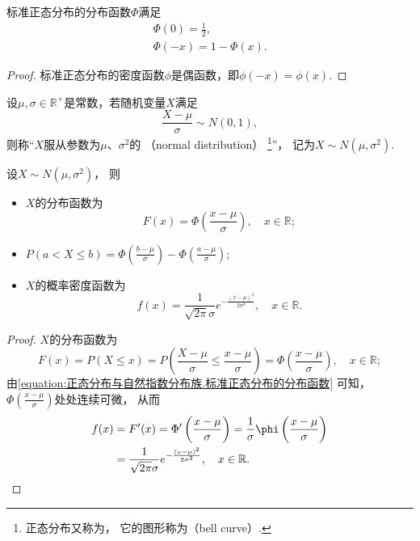 \begin{property}
标准正态分布的分布函数\(\Phi\)满足\begin{gather}
	\Phi(0) = \frac12, \\
	\Phi(-x) = 1 - \Phi(x). \label{equation:正态分布.标准正态分布的分布函数的对称性}
\end{gather}
\begin{proof}
标准正态分布的密度函数\(\phi\)是偶函数，即\(\phi(-x) = \phi(x)\).
\end{proof}
\end{property}

\begin{definition}\label{definition:正态分布.正态分布的定义}
设\(\mu,\sigma\in\mathbb{R}^+\)是常数，若随机变量\(X\)满足\begin{equation*}
	\frac{X-\mu}{\sigma} \sim N(0,1),
\end{equation*}
则称“\(X\)服从参数为\(\mu\)、\(\sigma^2\)的%
（normal distribution）%
\footnote{正态分布又称为，
它的图形称为（bell curve）.}”，
记为\(X \sim N(\mu,\sigma^2)\).
\end{definition}

\begin{theorem}
设\(X \sim N(\mu,\sigma^2)\)，
则\begin{itemize}
	\item \(X\)的分布函数为\begin{equation*}
		F(x) = \Phi\left(\frac{x-\mu}{\sigma}\right),
		\quad x\in\mathbb{R};
	\end{equation*}
	\item \(P(a < X \leq b) = \Phi\left(\frac{b-\mu}{\sigma}\right) - \Phi\left(\frac{a-\mu}{\sigma}\right)\);
	\item \(X\)的概率密度函数为\begin{equation}\label{equation:连续型分布.正态分布的密度函数}
		f(x) = \frac{1}{\sqrt{2 \pi} \sigma} e^{-\frac{(x-\mu)^2}{2\sigma^2}},
		\quad x\in\mathbb{R}.
	\end{equation}
\end{itemize}
\begin{proof}
\(X\)的分布函数为\begin{equation*}
	F(x) = P(X \leq x)
	= P\left(\frac{X-\mu}{\sigma}\leq\frac{x-\mu}{\sigma}\right)
	= \Phi\left(\frac{x-\mu}{\sigma}\right), \quad x\in\mathbb{R};
\end{equation*}
由\cref{equation:正态分布与自然指数分布族.标准正态分布的分布函数} 可知，
\(\Phi\left(\frac{x-\mu}{\sigma}\right)\)处处连续可微，
从而\begin{align*}
	f(x) &= F'(x) = \Phi'\left(\frac{x-\mu}{\sigma}\right)
	= \frac{1}{\sigma} \phi\left(\frac{x-\mu}{\sigma}\right) \\
	&= \frac{1}{\sqrt{2 \pi} \sigma} e^{-\frac{(x-\mu)^2}{2\sigma^2}},
	\quad x\in\mathbb{R}.
	\qedhere
\end{align*}
\end{proof}
\end{theorem}


